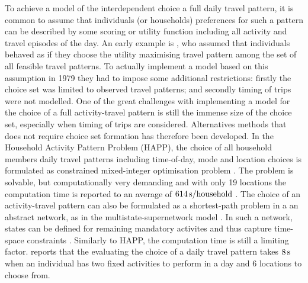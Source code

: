 To achieve a model of the interdependent choice a full daily travel pattern, it is common to assume that individuals (or households) preferences for such a pattern can be described by some scoring or utility function including all activity and travel episodes of the day. An early example is \citet{Adler79}, who assumed that individuals behaved as if they choose the utility maximising travel pattern among the set of all feasible travel patterns.
To actually implement a model based on this assumption in 1979 they had to impose some additional restrictions: firstly the choice set was limited to observed travel patterns; and secondly timing of trips were not modelled. One of the great challenges with implementing a model for the choice of a full activity-travel pattern is still the immense size of the choice set, especially when timing of trips are considered. Alternatives methods that does not require choice set formation has therefore been developed. In the Household Activity Pattern Problem (HAPP), the choice of all household members daily travel patterns including time-of-day, mode and location choices is formulated as constrained mixed-integer optimisation problem \citep{recker2001bridge,Recker08,Recker13,yuan2014HAPP}. The problem is solvable, but computationally very demanding and with only 19 locations the computation time is reported to an average of $614\, \mathrm{s/household}$ \citep{Recker13}. The choice of an activity-travel pattern can also be formulated as a shortest-path problem in a an abstract network, as in the multistate-supernetwork model \citep{arentze04Multistate}. In such a network, states can be defined for remaining mandatory activites and thus capture time-space constraints \citep{liao2013incorporating,liao2016modeling}. Similarly to HAPP, the computation time is still a limiting factor. \citet{liao2016modeling} reports that the evaluating the choice of a daily travel pattern takes $8\, \mathrm{s}$ when an individual has two fixed activities to perform in a day and 6 locations to choose from.

